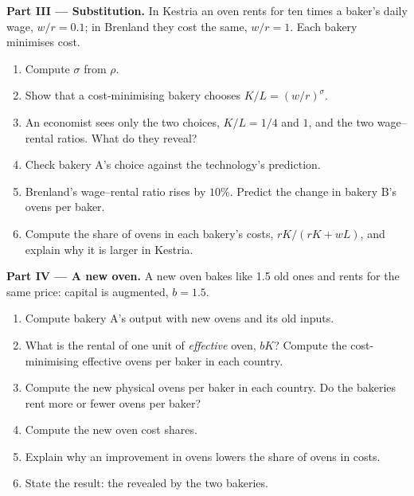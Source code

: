 \begin{problem}
\medskip\noindent\textbf{Part III --- Substitution.} In Kestria an oven rents
for ten times a baker's daily wage, $w/r = 0.1$; in Brenland they cost the
same, $w/r = 1$. Each bakery minimises cost.
\begin{enumerate}[resume]
  \item Compute $\sigma$ from $\rho$.
  \item Show that a cost-minimising bakery chooses $K/L = (w/r)^\sigma$.
  \item An economist sees only the two choices, $K/L = 1/4$ and $1$, and the two wage--rental ratios. What  do they reveal?
  \item Check bakery A's choice against the technology's prediction.
  \item Brenland's wage--rental ratio rises by $10\%$. Predict the change in bakery B's ovens per baker.
  \item Compute the share of ovens in each bakery's costs, $rK/(rK + wL)$, and explain why it is larger in Kestria.
\end{enumerate}

\medskip\noindent\textbf{Part IV --- A new oven.} A new oven bakes like 1.5 old
ones and rents for the same price: capital is augmented, $b = 1.5$.
\begin{enumerate}[resume]
  \item Compute bakery A's output with new ovens and its old inputs.
  \item What is the rental of one unit of \emph{effective} oven, $bK$? Compute the cost-minimising effective ovens per baker in each country.
  \item Compute the new physical ovens per baker in each country. Do the bakeries rent more or fewer ovens per baker?
  \item Compute the new oven cost shares.
  \item Explain why an improvement in ovens lowers the share of ovens in costs.
  \item State the result: the  revealed by the two bakeries.
\end{enumerate}
\end{problem}
